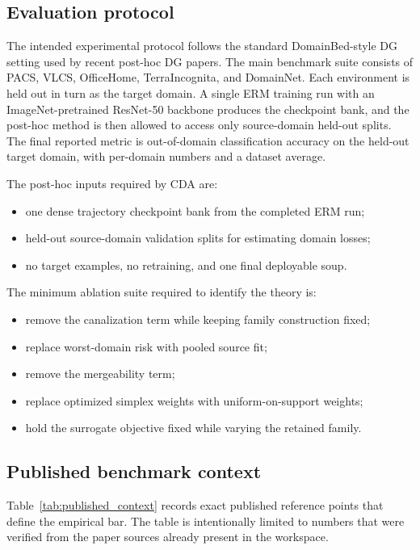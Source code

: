 \documentclass{article}
\theoremstyle{definition}
\newcommand{\cda}{\textup{\textsc{CDA}}}
\begin{document}
\subsection{Evaluation protocol}

The intended experimental protocol follows the standard DomainBed-style DG setting used by recent post-hoc DG papers. The main benchmark suite consists of PACS, VLCS, OfficeHome, TerraIncognita, and DomainNet. Each environment is held out in turn as the target domain. A single ERM training run with an ImageNet-pretrained ResNet-50 backbone produces the checkpoint bank, and the post-hoc method is then allowed to access only source-domain held-out splits. The final reported metric is out-of-domain classification accuracy on the held-out target domain, with per-domain numbers and a dataset average.

The post-hoc inputs required by \cda{} are:
\begin{itemize}[leftmargin=1.3em]
    \item one dense trajectory checkpoint bank from the completed ERM run;
    \item held-out source-domain validation splits for estimating domain losses;
    \item no target examples, no retraining, and one final deployable soup.
\end{itemize}
The minimum ablation suite required to identify the theory is:
\begin{itemize}[leftmargin=1.3em]
    \item remove the canalization term while keeping family construction fixed;
    \item replace worst-domain risk with pooled source fit;
    \item remove the mergeability term;
    \item replace optimized simplex weights with uniform-on-support weights;
    \item hold the surrogate objective fixed while varying the retained family.
\end{itemize}

\subsection{Published benchmark context}

Table~\ref{tab:published_context} records exact published reference points that define the empirical bar. The table is intentionally limited to numbers that were verified from the paper sources already present in the workspace.
\end{document}
